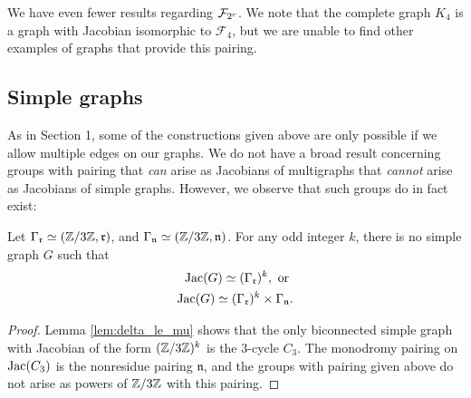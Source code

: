 \documentclass{amsart}
\begin{document}
We have even fewer results regarding $\mathcal{F}_{2^{r}}$. We note that the complete
graph $K_4$ is a graph with Jacobian isomorphic to $\mathcal{F}_4$,
but we are unable to find other examples of graphs that provide this
pairing.

\subsection{Simple graphs}
As in Section 1, some of the constructions given above are only
possible if we allow multiple edges on our graphs. We do not have a
broad result concerning groups with pairing that \emph{can} arise as
Jacobians of multigraphs that \emph{cannot} arise as Jacobians of
simple graphs. However, we observe that such groups do in fact exist:

\begin{thm}
  Let $\Gamma_\mathfrak{r} \simeq (\mathbb{Z}/3\mathbb{Z}, \mathfrak{r})$, and
  $\Gamma_\mathfrak{n} \simeq (\mathbb{Z}/3\mathbb{Z}, \mathfrak{n})$. For any odd
  integer $k$, there is no simple graph $G$ such that
  \begin{align*}
      \operatorname{Jac}(G) \simeq (\Gamma_\mathfrak{r})^k, \text{ or } \\
      \operatorname{Jac}(G) \simeq (\Gamma_\mathfrak{r})^k \times \Gamma_\mathfrak{n}.
  \end{align*}
\end{thm}
\begin{proof}
Lemma \ref{lem:delta_le_mu} shows that the only biconnected simple
graph with Jacobian of the form $(\mathbb{Z}/3\mathbb{Z})^k$ is the $3$-cycle
$C_3$. The monodromy pairing on $\operatorname{Jac}(C_3)$ is the nonresidue pairing
$\mathfrak{n}$, and the groups with pairing given above do not arise
as powers of $\mathbb{Z}/3\mathbb{Z}$ with this pairing.
\end{proof}

\nocite{*}


\end{document}

